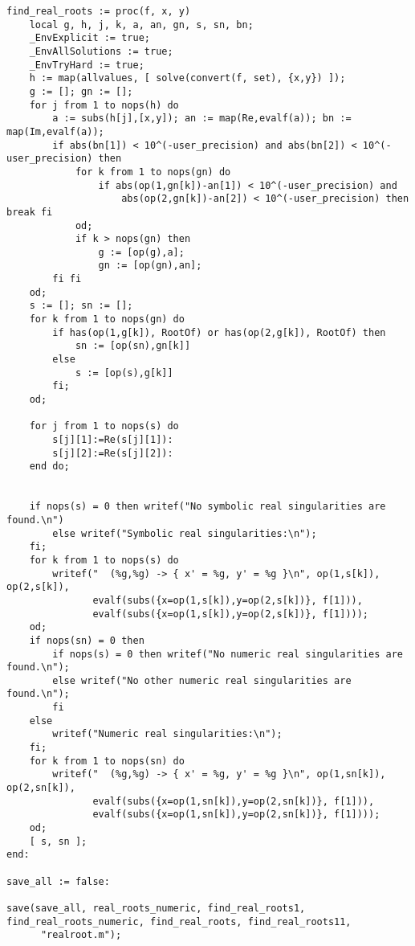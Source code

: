 \documentclass[a4paper,10pt]{article}
\begin{document}
\begin{lstlisting}[name=realroot]
find_real_roots := proc(f, x, y)
    local g, h, j, k, a, an, gn, s, sn, bn;
    _EnvExplicit := true;
    _EnvAllSolutions := true;
    _EnvTryHard := true;
    h := map(allvalues, [ solve(convert(f, set), {x,y}) ]);
    g := []; gn := [];
    for j from 1 to nops(h) do
        a := subs(h[j],[x,y]); an := map(Re,evalf(a)); bn := map(Im,evalf(a));
        if abs(bn[1]) < 10^(-user_precision) and abs(bn[2]) < 10^(-user_precision) then
            for k from 1 to nops(gn) do
                if abs(op(1,gn[k])-an[1]) < 10^(-user_precision) and
                    abs(op(2,gn[k])-an[2]) < 10^(-user_precision) then break fi
            od;
            if k > nops(gn) then
                g := [op(g),a];
                gn := [op(gn),an];
        fi fi
    od;
    s := []; sn := [];
    for k from 1 to nops(gn) do
        if has(op(1,g[k]), RootOf) or has(op(2,g[k]), RootOf) then
            sn := [op(sn),gn[k]]
        else
            s := [op(s),g[k]]
        fi;
    od;

    for j from 1 to nops(s) do
        s[j][1]:=Re(s[j][1]):
        s[j][2]:=Re(s[j][2]):
    end do;


    if nops(s) = 0 then writef("No symbolic real singularities are found.\n")
        else writef("Symbolic real singularities:\n");
    fi;
    for k from 1 to nops(s) do
        writef("  (%g,%g) -> { x' = %g, y' = %g }\n", op(1,s[k]), op(2,s[k]),
               evalf(subs({x=op(1,s[k]),y=op(2,s[k])}, f[1])),
               evalf(subs({x=op(1,s[k]),y=op(2,s[k])}, f[1])));
    od;
    if nops(sn) = 0 then
        if nops(s) = 0 then writef("No numeric real singularities are found.\n");
        else writef("No other numeric real singularities are found.\n");
        fi
    else
        writef("Numeric real singularities:\n");
    fi;
    for k from 1 to nops(sn) do
        writef("  (%g,%g) -> { x' = %g, y' = %g }\n", op(1,sn[k]), op(2,sn[k]),
               evalf(subs({x=op(1,sn[k]),y=op(2,sn[k])}, f[1])),
               evalf(subs({x=op(1,sn[k]),y=op(2,sn[k])}, f[1])));
    od;
    [ s, sn ];
end:

save_all := false:

save(save_all, real_roots_numeric, find_real_roots1, find_real_roots_numeric, find_real_roots, find_real_roots11,
      "realroot.m");
\end{lstlisting}
\end{document}

